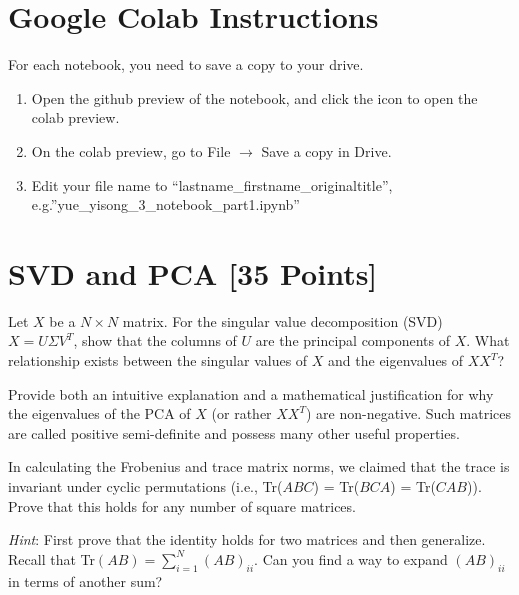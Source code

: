 \section*{Google Colab Instructions}

For each notebook, you need to save a copy to your drive.

\begin{enumerate}
	\item Open the github preview of the notebook, and click the icon to open the colab preview.
	\item On the colab preview, go to File $\rightarrow$ Save a copy in Drive.
	\item Edit your file name to “lastname_firstname_originaltitle”, e.g.”yue_yisong_3_notebook_part1.ipynb”
\end{enumerate}


\newpage
\section{SVD and PCA [35 Points]}

\problem[3] Let $X$ be a $N \times N$ matrix. For the singular value decomposition (SVD) $X = U \Sigma V^T$, show that the columns of $U$ are the principal components of $X$. What relationship exists between the singular values of $X$ and the eigenvalues of $XX^T$?

\begin{solution}

\end{solution}

\problem[4] Provide both an intuitive explanation and a mathematical justification for why the eigenvalues of the PCA of $X$ (or rather $XX^T$) are non-negative. Such matrices are called positive semi-definite and possess many other useful properties.

\begin{solution}

\end{solution}

\problem[5] In calculating the Frobenius and trace matrix norms, we claimed that the trace is invariant under cyclic permutations (i.e., Tr($ABC$) = Tr($BCA$) = Tr($CAB$)). Prove that this holds for any number of square matrices.

\textit{Hint}: First prove that the identity holds for two matrices and then generalize. Recall that Tr$(AB) = \sum_{i=1}^{N}(AB)_{ii}$. Can you find a way to expand $(AB)_{ii}$ in terms of another sum?

